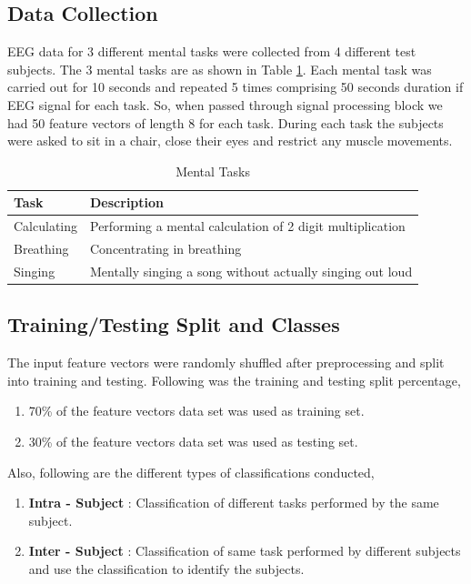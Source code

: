 \documentclass[11pt]{article}
\begin{document}
	\subsection{Data Collection}
		EEG data for 3 different mental tasks were collected from 4 different test subjects. The 3 mental tasks are as shown in Table \ref{Tasks}. Each mental task was carried out for 10 seconds and repeated 5 times comprising 50 seconds duration if EEG signal for each task. So, when passed through signal processing block we had 50 feature vectors of length 8 for each task. During each task the subjects were asked to sit in a chair, close their eyes and restrict any muscle movements.
		\begin{table}[h]
			\centering
			\caption{Mental Tasks}
			\label{Tasks}
			\begin{tabular}{l l}
				\hline
				Task &Description\\\hline
				Calculating&Performing a mental calculation of 2 digit multiplication\\
				Breathing&Concentrating in breathing\\
				Singing&Mentally singing a song without actually singing out loud\\
			\end{tabular}
		\end{table}

	\subsection{Training/Testing Split and Classes}
		The input feature vectors were randomly shuffled after preprocessing and split into training and testing. Following was the training and testing split percentage,
		\begin{enumerate}
			\item 70\% of the feature vectors data set was used as training set.
			\item 30\% of the feature vectors data set was used as testing set.
		\end{enumerate}
		
		Also, following are the different types of classifications conducted,
		\begin{enumerate}
			\item \textbf{Intra - Subject} : Classification of different tasks performed by the same subject.
			\item \textbf{Inter - Subject} : Classification of same task performed by different subjects and use the classification to identify the subjects.
		\end{enumerate}
\end{document}
